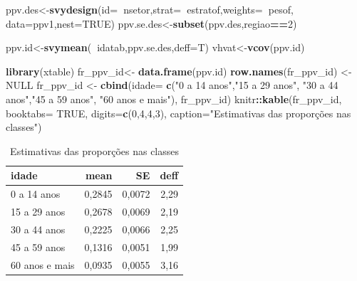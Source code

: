 \documentclass[]{book}
\newenvironment{Shaded}{\begin{snugshade}}{\end{snugshade}}
\newcommand{\KeywordTok}[1]{\textcolor[rgb]{0.13,0.29,0.53}{\textbf{#1}}}
\newcommand{\DataTypeTok}[1]{\textcolor[rgb]{0.13,0.29,0.53}{#1}}
\newcommand{\DecValTok}[1]{\textcolor[rgb]{0.00,0.00,0.81}{#1}}
\newcommand{\StringTok}[1]{\textcolor[rgb]{0.31,0.60,0.02}{#1}}
\newcommand{\OtherTok}[1]{\textcolor[rgb]{0.56,0.35,0.01}{#1}}
\newcommand{\OperatorTok}[1]{\textcolor[rgb]{0.81,0.36,0.00}{\textbf{#1}}}
\newcommand{\NormalTok}[1]{#1}
\theoremstyle{definition}
\theoremstyle{definition}
\theoremstyle{definition}
\theoremstyle{remark}
\begin{document}
\begin{Shaded}
\begin{Highlighting}[]
\NormalTok{ppv.des<-}\KeywordTok{svydesign}\NormalTok{(}\DataTypeTok{id=}\OperatorTok{~}\NormalTok{nsetor,}\DataTypeTok{strat=}\OperatorTok{~}\NormalTok{estratof,}\DataTypeTok{weights=}\OperatorTok{~}\NormalTok{pesof,}
\DataTypeTok{data=}\NormalTok{ppv1,}\DataTypeTok{nest=}\OtherTok{TRUE}\NormalTok{)}
\NormalTok{ppv.se.des<-}\KeywordTok{subset}\NormalTok{(ppv.des,regiao}\OperatorTok{==}\DecValTok{2}\NormalTok{)}
\end{Highlighting}
\end{Shaded}

\begin{Shaded}
\begin{Highlighting}[]
\NormalTok{ppv.id<-}\KeywordTok{svymean}\NormalTok{(}\OperatorTok{~}\NormalTok{idatab,ppv.se.des,}\DataTypeTok{deff=}\NormalTok{T)}
\NormalTok{vhvat<-}\KeywordTok{vcov}\NormalTok{(ppv.id)}
\end{Highlighting}
\end{Shaded}

\begin{Shaded}
\begin{Highlighting}[]
\KeywordTok{library}\NormalTok{(xtable)}
\NormalTok{fr_ppv_id<-}\StringTok{ }\KeywordTok{data.frame}\NormalTok{(ppv.id)}
\KeywordTok{row.names}\NormalTok{(fr_ppv_id) <-}\StringTok{ }\OtherTok{NULL}
\NormalTok{fr_ppv_id <-}\StringTok{ }\KeywordTok{cbind}\NormalTok{(}\DataTypeTok{idade=} \KeywordTok{c}\NormalTok{(}\StringTok{"0 a 14 anos"}\NormalTok{,}\StringTok{"15 a 29 anos"}\NormalTok{, }\StringTok{"30 a 44 anos"}\NormalTok{,}\StringTok{"45 a 59 anos"}\NormalTok{, }\StringTok{"60 anos e mais"}\NormalTok{), fr_ppv_id)}
\NormalTok{knitr}\OperatorTok{::}\KeywordTok{kable}\NormalTok{(fr_ppv_id, }\DataTypeTok{booktabs=} \OtherTok{TRUE}\NormalTok{, }\DataTypeTok{digits=}\KeywordTok{c}\NormalTok{(}\DecValTok{0}\NormalTok{,}\DecValTok{4}\NormalTok{,}\DecValTok{4}\NormalTok{,}\DecValTok{3}\NormalTok{), }\DataTypeTok{caption=}\StringTok{"Estimativas das proporções nas classes"}\NormalTok{) }
\end{Highlighting}
\end{Shaded}

\begin{table}

\caption{\label{tab:estpropclas}Estimativas das proporções nas classes}
\centering
\begin{tabular}[t]{lrrr}
\toprule
idade & mean & SE & deff\\
\midrule
0 a 14 anos & 0,2845 & 0,0072 & 2,29\\
15 a 29 anos & 0,2678 & 0,0069 & 2,19\\
30 a 44 anos & 0,2225 & 0,0066 & 2,25\\
45 a 59 anos & 0,1316 & 0,0051 & 1,99\\
60 anos e mais & 0,0935 & 0,0055 & 3,16\\
\bottomrule
\end{tabular}
\end{table}
\end{document}
